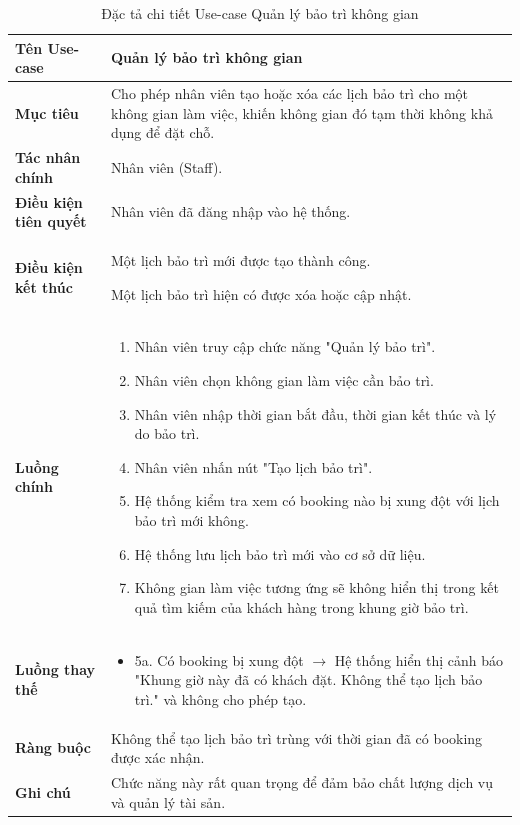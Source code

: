 \begin{table}[H]
\centering
\renewcommand{\arraystretch}{1.3}
\begin{tabular}{|p{4cm}|p{10cm}|}
\hline
\textbf{Tên Use-case} 
& Quản lý bảo trì không gian \\ 
\hline

\textbf{Mục tiêu} 
& Cho phép nhân viên tạo hoặc xóa các lịch bảo trì cho một không gian làm việc, khiến không gian đó tạm thời không khả dụng để đặt chỗ. \\ 
\hline

\textbf{Tác nhân chính} 
& Nhân viên (Staff). \\ 
\hline

\textbf{Điều kiện tiên quyết} 
& Nhân viên đã đăng nhập vào hệ thống. \\ 
\hline

\textbf{Điều kiện kết thúc} 
& 
\item Một lịch bảo trì mới được tạo thành công.
\item Một lịch bảo trì hiện có được xóa hoặc cập nhật.
\\ 
\hline

\textbf{Luồng chính} 
& 
\begin{enumerate}
    \item Nhân viên truy cập chức năng "Quản lý bảo trì".
    \item Nhân viên chọn không gian làm việc cần bảo trì.
    \item Nhân viên nhập thời gian bắt đầu, thời gian kết thúc và lý do bảo trì.
    \item Nhân viên nhấn nút "Tạo lịch bảo trì".
    \item Hệ thống kiểm tra xem có booking nào bị xung đột với lịch bảo trì mới không.
    \item Hệ thống lưu lịch bảo trì mới vào cơ sở dữ liệu.
    \item Không gian làm việc tương ứng sẽ không hiển thị trong kết quả tìm kiếm của khách hàng trong khung giờ bảo trì.
\end{enumerate} \\ 
\hline

\textbf{Luồng thay thế} 
& 
\begin{itemize}
    \item 5a. Có booking bị xung đột $\rightarrow$ Hệ thống hiển thị cảnh báo "Khung giờ này đã có khách đặt. Không thể tạo lịch bảo trì." và không cho phép tạo.
\end{itemize} \\ 
\hline

\textbf{Ràng buộc} 
& Không thể tạo lịch bảo trì trùng với thời gian đã có booking được xác nhận. \\ 
\hline

\textbf{Ghi chú} 
& Chức năng này rất quan trọng để đảm bảo chất lượng dịch vụ và quản lý tài sản. \\ 
\hline
\end{tabular}
\caption{Đặc tả chi tiết Use-case Quản lý bảo trì không gian}
\label{tab:maintenance-spec}
\end{table}

